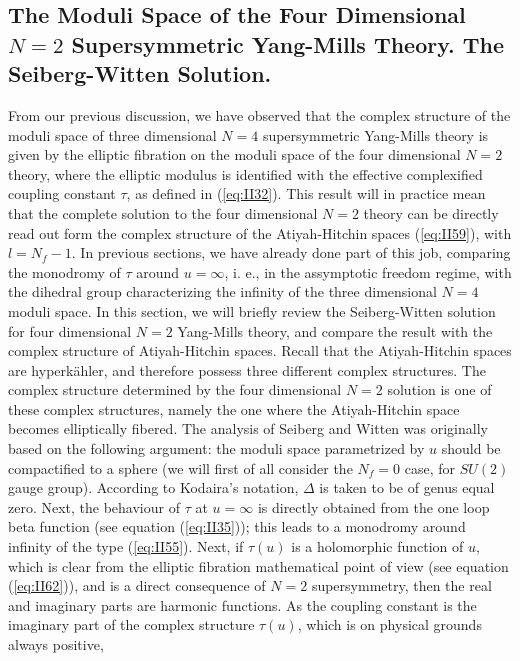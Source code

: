 \subsection{The Moduli Space of the Four Dimensional $N\!=\!2$
Supersymmetric Yang-Mills Theory. The Seiberg-Witten Solution.}

From our previous discussion, we have observed that the complex
structure of the moduli space of three dimensional $N\!=\!4$
supersymmetric Yang-Mills theory is given by the elliptic
fibration on the moduli space of the four dimensional $N\!=\!2$
theory, where the elliptic modulus is identified with the
effective complexified coupling constant $\tau$, as defined in
(\ref{eq:II32}). This result will in practice mean that the complete 
solution to the four dimensional $N\!=\!2$ theory can be directly 
read out form the complex structure of the Atiyah-Hitchin spaces 
(\ref{eq:II59}), with $l=N_f-1$. In previous sections, we have 
already done part of this job, comparing the monodromy of $\tau$ 
around $u=\infty$, i. e., in the assymptotic freedom regime, with the 
dihedral group characterizing the infinity of the three dimensional 
$N\!=\!4$ moduli space. In this section, we will briefly review the 
Seiberg-Witten solution \cite{SW,SW2,rep1,rep2,rep3,rep4,rep5,rep6,IS,Reviews} 
for four dimensional $N\!=\!2$ Yang-Mills theory, 
and compare the result with the complex structure of 
Atiyah-Hitchin spaces. Recall that the 
Atiyah-Hitchin spaces are hyperk\"{a}hler, and therefore possess three 
different complex structures. The complex structure determined by the 
four dimensional $N\!=\!2$ solution is one of these complex structures, 
namely the one where the Atiyah-Hitchin space becomes elliptically 
fibered. The analysis of Seiberg and Witten was originally based on the 
following argument: the moduli space parametrized by $u$ should be compactified 
to a sphere (we will first of all consider the $N_f=0$ case, for $SU(2)$ gauge 
group). According to Kodaira's notation, $\Delta$ is taken to be of 
genus equal zero. Next, the behaviour of $\tau$ at 
$u=\infty$ is directly obtained from the one loop beta function (see 
equation (\ref{eq:II35})); this leads to a monodromy around infinity 
of the type (\ref{eq:II55}). Next, if $\tau(u)$ is a holomorphic function of $u$, 
which is clear from the elliptic fibration mathematical point of view (see 
equation (\ref{eq:II62})), and is a direct consequence of $N\!=\!2$ 
supersymmetry, then the real and imaginary parts are 
harmonic functions. As the coupling constant is the imaginary part of the 
complex structure $\tau(u)$, which is on physical grounds always positive, 
